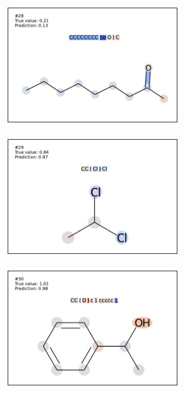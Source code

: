 \begin{figure}
\begin{subfigure}[b]{0.33\textwidth}
\end{subfigure}\begin{subfigure}[b]{0.33\textwidth} 
  \centering 
  \includegraphics[width=\textwidth]{figures/esol/esol28.pdf} 
\end{subfigure}
\begin{subfigure}[b]{0.33\textwidth} 
  \centering 
  \includegraphics[width=\textwidth]{figures/esol/esol29.pdf} 
\end{subfigure}\begin{subfigure}[b]{0.33\textwidth} 
  \centering 
  \includegraphics[width=\textwidth]{figures/esol/esol30.pdf} 

\end{subfigure}
\end{figure}
